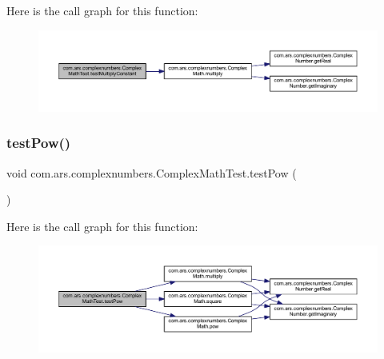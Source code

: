 Here is the call graph for this function\+:\nopagebreak
\begin{figure}[H]
\begin{center}
\leavevmode
\includegraphics[width=350pt]{classcom_1_1ars_1_1complexnumbers_1_1_complex_math_test_a118231be2a26c23d165d3b40093352ac_cgraph}
\end{center}
\end{figure}
\hypertarget{classcom_1_1ars_1_1complexnumbers_1_1_complex_math_test_a70af211131478c43b06210fe524d3bd7}{}\label{classcom_1_1ars_1_1complexnumbers_1_1_complex_math_test_a70af211131478c43b06210fe524d3bd7} 
\subsubsection{\texorpdfstring{test\+Pow()}{testPow()}}
{\footnotesize\ttfamily void com.\+ars.\+complexnumbers.\+Complex\+Math\+Test.\+test\+Pow (\begin{DoxyParamCaption}{ }\end{DoxyParamCaption})}

Here is the call graph for this function\+:\nopagebreak
\begin{figure}[H]
\begin{center}
\leavevmode
\includegraphics[width=350pt]{classcom_1_1ars_1_1complexnumbers_1_1_complex_math_test_a70af211131478c43b06210fe524d3bd7_cgraph}
\end{center}
\end{figure}
\hypertarget{classcom_1_1ars_1_1complexnumbers_1_1_complex_math_test_ab429903cc819ea2c83369e07ba2f49e9}{}\label{classcom_1_1ars_1_1complexnumbers_1_1_complex_math_test_ab429903cc819ea2c83369e07ba2f49e9} 
